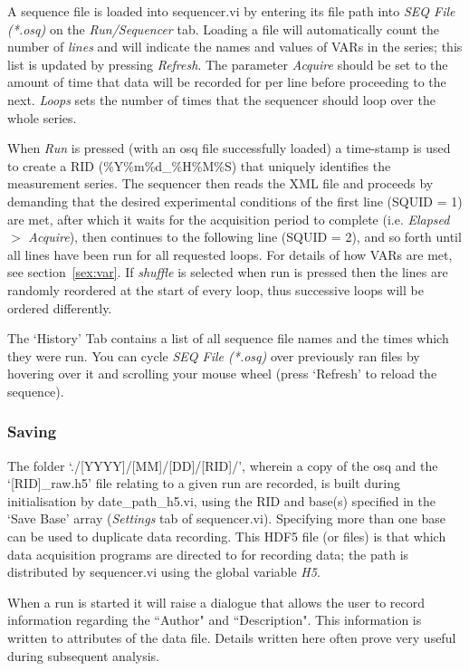 \documentclass[10pt,a4paper]{article}
\begin{document}
A sequence file is loaded into sequencer.vi by entering its file path into  \emph{SEQ File (*.osq)} on the \emph{Run/Sequencer} tab.  Loading a file will automatically count the number of \emph{lines} and will indicate the names and values of VARs in the series; this list is updated by pressing \emph{Refresh}.  The parameter \emph{Acquire} should be set to the amount of time that data will be recorded for per line before proceeding to the next. \emph{Loops} sets the number of times that the sequencer should loop over the whole series. 

When \emph{Run} is pressed (with an osq file successfully loaded) a time-stamp is used to create a RID (\%Y\%m\%d\_\%H\%M\%S) that uniquely identifies the measurement series. The sequencer then reads the XML file and proceeds by demanding that the desired experimental conditions of the first line (SQUID = 1) are met, after which it waits for the acquisition period to complete (i.e. \emph{Elapsed} $>$ \emph{Acquire}), then continues to the following line (SQUID = 2), and so forth until all lines have been run for all requested loops.  For details of how VARs are met, see section~\ref{sex:var}.  If \emph{shuffle} is selected when run is pressed then the lines are randomly reordered at the start of every loop, thus successive loops will be ordered differently.

The `History' Tab contains a list of all sequence file names and the times which they were run.  You can cycle \emph{SEQ File (*.osq)} over previously ran files by hovering over it and scrolling your mouse wheel (press `Refresh' to reload the sequence).

\subsubsection{Saving}
The folder `./[YYYY]/[MM]/[DD]/[RID]/', wherein a copy of the osq and the `[RID]\_raw.h5' file relating to a given run are recorded, is built during initialisation by date\_path\_h5.vi, using the RID and base(s) specified in the `Save Base' array (\emph{Settings} tab of sequencer.vi).   Specifying more than one base can be used to duplicate data recording.  This HDF5 file (or files) is that which data acquisition programs are directed to for recording data; the path is distributed by sequencer.vi using the global variable \emph{H5}.

When a run is started it will raise a dialogue that allows the user to record information regarding the ``Author" and ``Description".  This information is written to attributes of the data file.  Details written here often prove very useful during subsequent analysis. 
\end{document}
